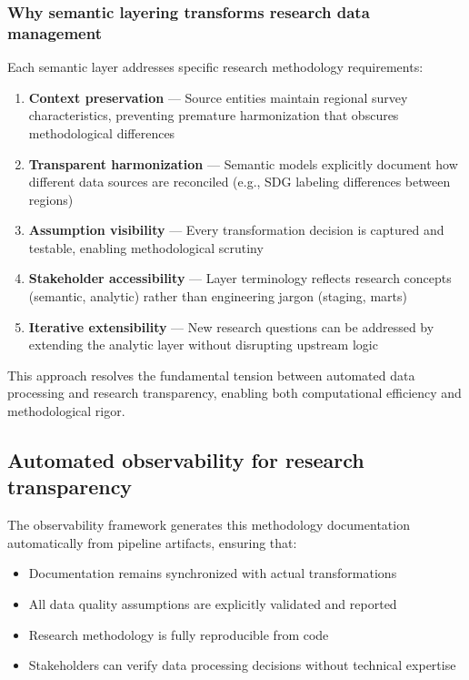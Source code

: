 \documentclass{article}
\begin{document}
\subsubsection{Why semantic layering transforms research data management}
\label{subsubsec:semantic-benefits}

Each semantic layer addresses specific research methodology requirements:

\begin{enumerate}
    \item \textbf{Context preservation} — Source entities maintain regional survey characteristics, preventing premature harmonization that obscures methodological differences
    \item \textbf{Transparent harmonization} — Semantic models explicitly document how different data sources are reconciled (e.g., SDG labeling differences between regions)
    \item \textbf{Assumption visibility} — Every transformation decision is captured and testable, enabling methodological scrutiny
    \item \textbf{Stakeholder accessibility} — Layer terminology reflects research concepts (semantic, analytic) rather than engineering jargon (staging, marts)
    \item \textbf{Iterative extensibility} — New research questions can be addressed by extending the analytic layer without disrupting upstream logic
\end{enumerate}

This approach resolves the fundamental tension between automated data processing and research transparency, enabling both computational efficiency and methodological rigor.

\subsection{Automated observability for research transparency}

The observability framework generates this methodology documentation automatically from pipeline artifacts, ensuring that:
\begin{itemize}
    \item Documentation remains synchronized with actual transformations
    \item All data quality assumptions are explicitly validated and reported
    \item Research methodology is fully reproducible from code
    \item Stakeholders can verify data processing decisions without technical expertise
\end{itemize}
\end{document}
